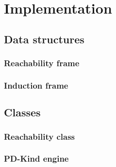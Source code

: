 \chapter{Implementation}

\section{Data structures}

\subsection{Reachability frame}

\subsection{Induction frame}

\section{Classes}

\subsection{Reachability class}

\subsection{PD-Kind engine}
